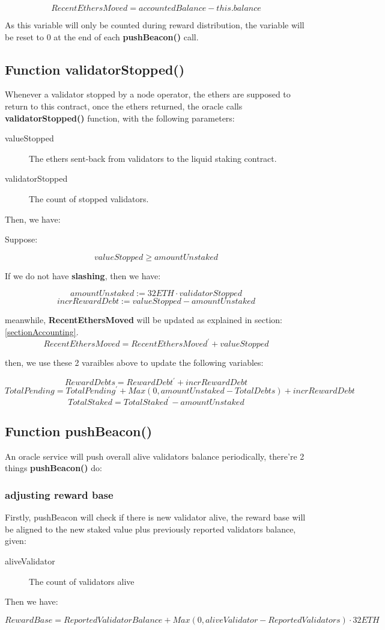 \documentclass{article}
\begin{document}
\[RecentEthersMoved = accountedBalance - this.balance\]

As this variable will only be counted during reward distribution, the variable will be reset to 0 at the end of each \textbf{pushBeacon()} call.

\subsection{Function validatorStopped()}
Whenever a validator stopped by a node operator, the ethers are supposed to return to this contract, once the ethers returned, the oracle calls \textbf{validatorStopped()} function, with the following parameters:
\begin{description}
\item[valueStopped] The ethers sent-back from validators to the liquid staking contract.
\item[validatorStopped] The count of stopped validators.
\end{description}
Then, we have:

\begin{theorem}[validatorStopped]
\label{validatorStopped}
Suppose:

\[valueStopped \geq amountUnstaked \]

If we do not have \textbf{slashing}, then we have:

\[amountUnstaked := 32 ETH \cdot validatorStopped\]
\[incrRewardDebt := valueStopped - amountUnstaked\]

meanwhile, \textbf{RecentEthersMoved} will be updated as explained in section:\ref{sectionAccounting}.
\[RecentEthersMoved = RecentEthersMoved^{\prime} + valueStopped\]

then, we use these 2 varaibles above to update the following variables:

\[RewardDebts = RewardDebt^{\prime} + incrRewardDebt\]
\[TotalPending = TotalPending^{\prime} + Max(0, amountUnstaked - TotalDebts) + incrRewardDebt\]
\[TotalStaked = TotalStaked^{\prime} -  amountUnstaked \]
\end{theorem}

\subsection{Function pushBeacon()}
An oracle service will push overall alive validators balance periodically, there're 2 things \textbf{pushBeacon()} do:
\subsubsection{adjusting reward base}
Firstly, pushBeacon will check if there is new validator alive, the reward base will be aligned to the new staked value plus previously reported validators balance, given:
\begin{description}
\item[aliveValidator] The count of validators alive
\end{description}
Then we have:
\begin{theorem}[pushBeacon]
\label{pushBeacon}
\[RewardBase = ReportedValidatorBalance + Max(0, aliveValidator - ReportedValidators) \cdot  32 ETH\]
\end{theorem}
\end{document}
